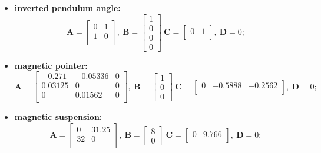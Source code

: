 \documentclass[runningheads,a4paper]{llncs}
\begin{document}
\begin{itemize}
{$$\begin{array}{c}
\end{array}\right]~
\textbf{C}=\left[\begin{array}{cccc}
0	& 0	& 1 & -0.75 \\
\end{array}\right],~ \textbf{D}= 0;
$$
}
\item{\textbf{inverted pendulum angle:} 
$$
\textbf{A}=\left[\begin{array}{cc}
0		& 1	\\
1		& 0	\\
\end{array}\right],~ \textbf{B} = \left[\begin{array}{c}
1 \\ 0 \\ 0 \\ 0
\end{array}\right]~
\textbf{C}=\left[\begin{array}{cc}
 0	& 1 \\
\end{array}\right],~ \textbf{D}= 0;
$$
}
\item{\textbf{magnetic pointer:} 
$$
\textbf{A}=\left[\begin{array}{ccc}
-0.271		& -0.05336	& 0	\\
0.03125		& 0			& 0	\\
0			& 0.01562 	& 0	\\	
\end{array}\right],~ \textbf{B} = \left[\begin{array}{c}
1 \\ 0 \\ 0
\end{array}\right]~
\textbf{C}=\left[\begin{array}{ccc}
0	& -0.5888	& -0.2562 \\
\end{array}\right],~ \textbf{D}= 0;
$$
}
\item{\textbf{magnetic suspension:} 
$$
\textbf{A}=\left[\begin{array}{cc}
0		& 31.25	\\
32		& 0		\\	
\end{array}\right],~ \textbf{B} = \left[\begin{array}{c}
8 \\ 0
\end{array}\right]~
\textbf{C}=\left[\begin{array}{cc}
0	& 9.766 	\\
\end{array}\right],~ \textbf{D}= 0;
$$}
\end{itemize}
\end{document}
